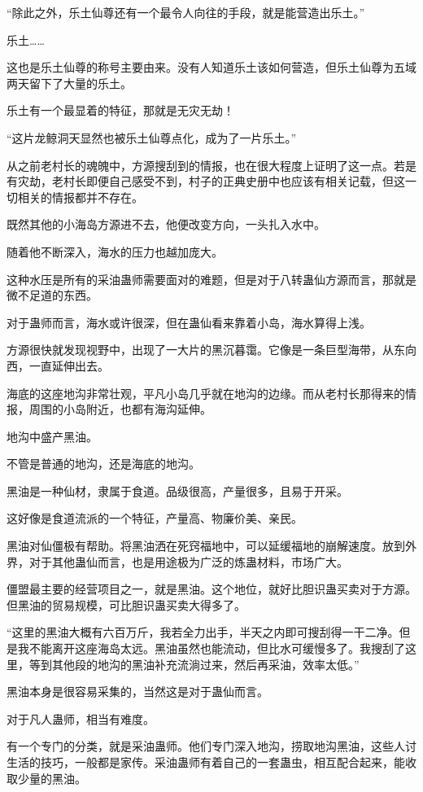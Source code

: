 \begin{this_body}
“除此之外，乐土仙尊还有一个最令人向往的手段，就是能营造出乐土。”

乐土……

这也是乐土仙尊的称号主要由来。没有人知道乐土该如何营造，但乐土仙尊为五域两天留下了大量的乐土。

乐土有一个最显着的特征，那就是无灾无劫！

“这片龙鲸洞天显然也被乐土仙尊点化，成为了一片乐土。”

从之前老村长的魂魄中，方源搜刮到的情报，也在很大程度上证明了这一点。若是有灾劫，老村长即便自己感受不到，村子的正典史册中也应该有相关记载，但这一切相关的情报都并不存在。

既然其他的小海岛方源进不去，他便改变方向，一头扎入水中。

随着他不断深入，海水的压力也越加庞大。

这种水压是所有的采油蛊师需要面对的难题，但是对于八转蛊仙方源而言，那就是微不足道的东西。

对于蛊师而言，海水或许很深，但在蛊仙看来靠着小岛，海水算得上浅。

方源很快就发现视野中，出现了一大片的黑沉暮霭。它像是一条巨型海带，从东向西，一直延伸出去。

海底的这座地沟非常壮观，平凡小岛几乎就在地沟的边缘。而从老村长那得来的情报，周围的小岛附近，也都有海沟延伸。

地沟中盛产黑油。

不管是普通的地沟，还是海底的地沟。

黑油是一种仙材，隶属于食道。品级很高，产量很多，且易于开采。

这好像是食道流派的一个特征，产量高、物廉价美、亲民。

黑油对仙僵极有帮助。将黑油洒在死窍福地中，可以延缓福地的崩解速度。放到外界，对于其他蛊仙而言，也是用途极为广泛的炼蛊材料，市场广大。

僵盟最主要的经营项目之一，就是黑油。这个地位，就好比胆识蛊买卖对于方源。但黑油的贸易规模，可比胆识蛊买卖大得多了。

“这里的黑油大概有六百万斤，我若全力出手，半天之内即可搜刮得一干二净。但是我不能离开这座海岛太远。黑油虽然也能流动，但比水可缓慢多了。我搜刮了这里，等到其他段的地沟的黑油补充流淌过来，然后再采油，效率太低。”

黑油本身是很容易采集的，当然这是对于蛊仙而言。

对于凡人蛊师，相当有难度。

有一个专门的分类，就是采油蛊师。他们专门深入地沟，捞取地沟黑油，这些人讨生活的技巧，一般都是家传。采油蛊师有着自己的一套蛊虫，相互配合起来，能收取少量的黑油。


\end{this_body}
